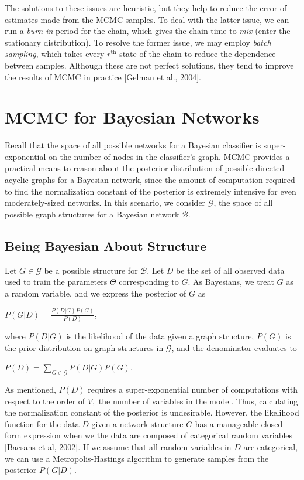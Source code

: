 \documentclass[12pt,twoside]{reedthesis}
\begin{document}
			The solutions to these issues are heuristic, but they help to reduce the error of estimates made from the MCMC samples. 
			To deal with the latter issue, we can run a {\em burn-in} period for the chain, which gives the chain time to {\em mix} (enter the stationary distribution). 
			To resolve the former issue, we may employ {\em batch sampling}, which takes every $r^{\text{th}}$ state of the chain to reduce the dependence between samples.
			Although these are not perfect solutions, they tend to improve the results of MCMC in practice [Gelman et al., 2004].
			
	\section{MCMC for Bayesian Networks}
	Recall that the space of all possible networks for a Bayesian classifier is super-exponential on the number of nodes in the classifier's graph. 
	MCMC provides a practical means to reason about the posterior distribution of possible directed acyclic graphs for a Bayesian network, since the amount of computation required to find the normalization constant of the posterior is extremely intensive for even moderately-sized networks. 
	In this scenario, we consider $\mathcal G$, the space of all possible graph structures for a Bayesian network $\mathcal B$.
		\subsection*{Being Bayesian About Structure}
			Let $G \in \mathcal G$ be a possible structure for $\mathcal B$. 
			Let $D$ be the set of all observed data used to train the parameters $\Theta$ corresponding to $G$. 
			As Bayesians, we treat $G$ as a random variable, and we express the posterior of $G$ as
			\begin{center}
				$P(G | D) = \displaystyle \frac{P(D|G)P(G)}{P(D)}$,
			\end{center}
			where $P(D | G)$ is the likelihood of the data given a graph structure,
			$P(G)$ is the prior distribution on graph structures in $\mathcal G$, and
			the denominator evaluates to
			\begin{center}
				$P(D) = \displaystyle \sum_{G \in \mathcal G}P(D | G) P(G)$.
			\end{center}
			As mentioned, $P(D)$ requires a super-exponential number of computations with respect to the order of $V,$ the number of variables in the model.
			Thus, calculating the normalization constant of the posterior is undesirable. 
			However, the likelihood function for the data $D$ given a network structure $G$ has a manageable closed form expression when we the data are composed of categorical random variables [Baesans et al, 2002]. 
			If we assume that all random variables in $D$ are categorical, we can use a Metropolis-Hastings algorithm to generate samples from the posterior $P(G | D)$.
\end{document}

